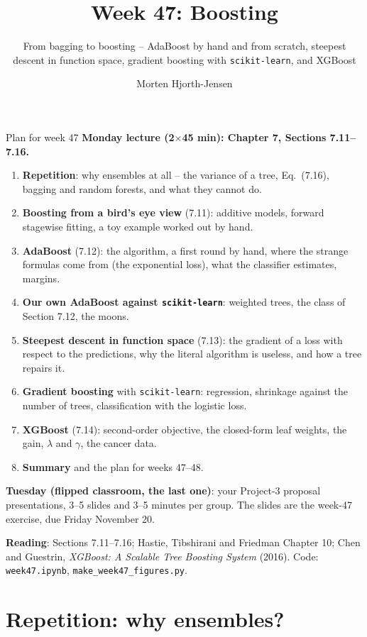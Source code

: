 \documentclass[10pt,aspectratio=169]{beamer}
\title{Week 47: Boosting}
\subtitle{From bagging to boosting -- AdaBoost by hand and from scratch,
  steepest descent in function space, gradient boosting with
  \texttt{scikit-learn}, and XGBoost}
\author{Morten Hjorth-Jensen}
\institute{Department of Physics and Center for Computing in Science Education,\\
  University of Oslo, Norway}
\date{}
\begin{document}
\begin{frame}
\titlepage
\end{frame}

\begin{frame}{Plan for week 47}
\footnotesize
\textbf{Monday lecture (2$\times$45 min): Chapter 7, Sections 7.11--7.16.}
\begin{enumerate}
  \item \textbf{Repetition}: why ensembles at all -- the variance of a tree,
    Eq.\ (7.16), bagging and random forests, and what they cannot do.
  \item \textbf{Boosting from a bird's eye view} (7.11): additive models,
    forward stagewise fitting, a toy example worked out by hand.
  \item \textbf{AdaBoost} (7.12): the algorithm, a first round by hand, where
    the strange formulas come from (the exponential loss), what the
    classifier estimates, margins.
  \item \textbf{Our own AdaBoost against \texttt{scikit-learn}}: weighted
    trees, the class of Section 7.12, the moons.
  \item \textbf{Steepest descent in function space} (7.13): the gradient of a
    loss with respect to the predictions, why the literal algorithm is
    useless, and how a tree repairs it.
  \item \textbf{Gradient boosting} with \texttt{scikit-learn}: regression,
    shrinkage against the number of trees, classification with the logistic
    loss.
  \item \textbf{XGBoost} (7.14): second-order objective, the closed-form leaf
    weights, the gain, $\lambda$ and $\gamma$, the cancer data.
  \item \textbf{Summary} and the plan for weeks 47--48.
\end{enumerate}
\textbf{Tuesday (flipped classroom, the last one)}: your Project-3 proposal
presentations, 3--5 slides and 3--5 minutes per group.  The slides are the
week-47 exercise, due Friday November 20.

\textbf{Reading}: Sections 7.11--7.16; Hastie, Tibshirani and Friedman
Chapter 10; Chen and Guestrin, \emph{XGBoost: A Scalable Tree Boosting
System} (2016).  Code: \texttt{week47.ipynb}, \texttt{make\_week47\_figures.py}.
\end{frame}

\section{Repetition: why ensembles?}
\end{document}
